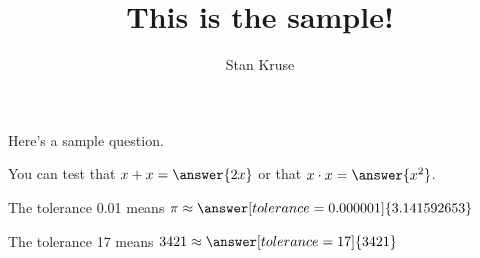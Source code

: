 \documentclass{ximera}
\title{This is the sample!}
\author{Stan Kruse}
\begin{document}
\maketitle

Here's a sample question.

\begin{problem}
\begin{multipleChoice}
\end{multipleChoice}
\end{problem}

\begin{problem}
   You can test that $x + x = \answer{2x}$ or that $x \cdot x = \answer{x^2}$.
    \begin{problem}
    The tolerance 0.01 means $\pi \approx \answer[tolerance=0.000001]{3.141592653}$
    \end{problem}
\end{problem}



\begin{problem}
   The tolerance 17 means $3421 \approx \answer[tolerance=17]{3421}$
\end{problem}
\end{document}
